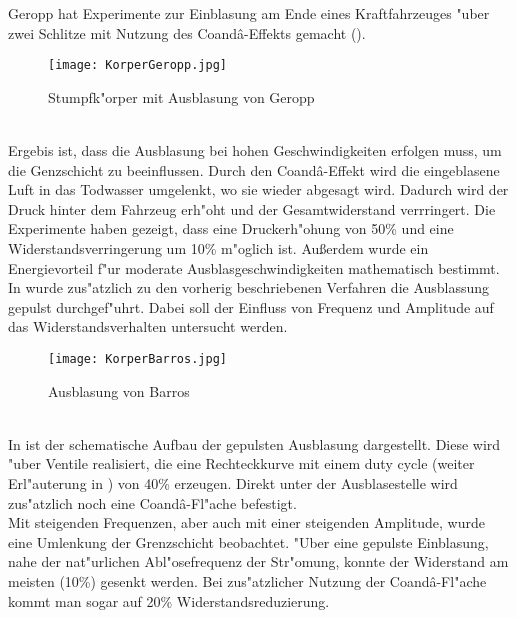 Geropp \cite{Geropp.2000} hat Experimente zur Einblasung am Ende eines Kraftfahrzeuges "uber zwei Schlitze mit Nutzung des Coand\^{a}-Effekts gemacht ().
\begin{figure}[h]
	\centering
	\texttt{[image: KorperGeropp.jpg]}
	\caption{Stumpfk"orper mit Ausblasung von Geropp \cite{Geropp.2000}}
	\label{fig:Geropp}
\end{figure}\\
Ergebis ist, dass die Ausblasung bei hohen Geschwindigkeiten erfolgen muss, um die Genzschicht zu beeinflussen. Durch den Coand\^{a}-Effekt wird die eingeblasene Luft in das Todwasser umgelenkt, wo sie wieder abgesagt wird. Dadurch wird der Druck hinter dem Fahrzeug erh"oht und der Gesamtwiderstand verrringert. Die Experimente haben gezeigt, dass eine Druckerh"ohung von 50\% und eine Widerstandsverringerung um 10\% m"oglich ist. Au\ss{}erdem wurde ein Energievorteil f"ur moderate Ausblasgeschwindigkeiten mathematisch bestimmt.\\

In \cite{Barros.2016} wurde zus"atzlich zu den vorherig beschriebenen Verfahren die Ausblassung gepulst durchgef"uhrt. Dabei soll der Einfluss von Frequenz und Amplitude auf das Widerstandsverhalten untersucht werden.
\begin{figure}[h]
	\centering
	\texttt{[image: KorperBarros.jpg]}
	\caption{Ausblasung von Barros \cite{Barros.2016}}
	\label{fig:Barros}
\end{figure}\\
In  ist der schematische Aufbau der gepulsten Ausblasung dargestellt. Diese wird "uber Ventile realisiert, die eine Rechteckkurve mit einem duty cycle (weiter Erl"auterung in ) von 40\% erzeugen. Direkt unter der Ausblasestelle wird zus"atzlich noch eine Coand\^{a}-Fl"ache befestigt.\\
Mit steigenden Frequenzen, aber auch mit einer steigenden Amplitude, wurde eine Umlenkung der Grenzschicht beobachtet. "Uber eine gepulste Einblasung, nahe der nat"urlichen Abl"osefrequenz der Str"omung, konnte der Widerstand am meisten (10\%) gesenkt werden. Bei zus"atzlicher Nutzung der Coand\^{a}-Fl"ache kommt man sogar auf 20\% Widerstandsreduzierung.

